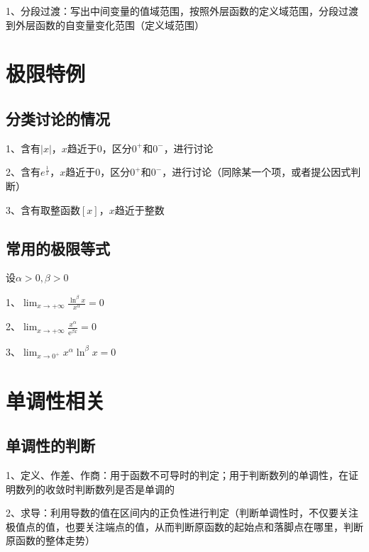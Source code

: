 1、分段过渡：写出中间变量的值域范围，按照外层函数的定义域范围，分段过渡到外层函数的自变量变化范围（定义域范围）

\section{极限特例}



\subsection{分类讨论的情况}

1、含有$ |x| $，$ x $趋近于0，区分$ 0^+ $和$ 0^- $，进行讨论

2、含有$ e^{\frac{1}{x}} $，$ x $趋近于0，区分$ 0^+ $和$ 0^- $，进行讨论（同除某一个项，或者提公因式判断）

3、含有取整函数$ [x] $，$ x $趋近于整数



\subsection{常用的极限等式}

设$ \alpha>0, \beta>0 $

1、$ \lim _{x \rightarrow+\infty} \frac{\ln ^{\beta} x}{x^{\alpha}}=0 $

2、$ \lim _{x \rightarrow+\infty} \frac{x^{\alpha}}{\mathrm{e}^{\beta x}}=0 $

3、$ \lim _{x \rightarrow 0^{+}} x^{\alpha} \ln ^{\beta} x=0 $

\section{单调性相关}



\subsection{单调性的判断}

1、定义、作差、作商：用于函数不可导时的判定；用于判断数列的单调性，在证明数列的收敛时判断数列是否是单调的

2、求导：利用导数的值在区间内的正负性进行判定（判断单调性时，不仅要关注极值点的值，也要关注端点的值，从而判断原函数的起始点和落脚点在哪里，判断原函数的整体走势）

